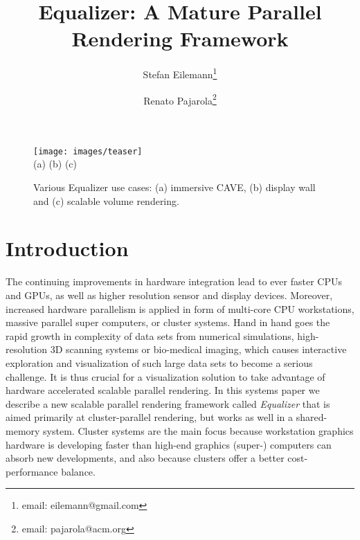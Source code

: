 \documentclass[journal]{vgtc}                %
\title{Equalizer: A Mature Parallel Rendering Framework}
\author{Stefan Eilemann\thanks{email: eilemann@gmail.com} \\ %
\and Renato Pajarola\thanks{email: pajarola@acm.org}}
\affiliation{\scriptsize Visualization and MultiMedia Lab \\ Department of Informatics \\ University of Z\"urich}
\begin{document}

\maketitle

\begin{figure*}[ht]\center
  \texttt{[image: images/teaser]} \\
  (a) \hfil \hfil (b) \hfil \hfil (c)
  \vspace{-2mm}
  \caption{Various Equalizer use cases: (a) immersive CAVE, (b) display wall and
    (c) scalable volume rendering.}
  \label{FIG_teaser}
\end{figure*}

\section{Introduction}

The continuing improvements in hardware integration lead to ever faster CPUs and GPUs, as well as higher resolution sensor and display devices. Moreover, increased hardware parallelism is applied in form of multi-core CPU workstations, massive parallel super computers, or cluster systems. Hand in hand goes the rapid growth in complexity of data sets from numerical simulations, high-resolution 3D scanning systems or bio-medical imaging, which causes interactive exploration and visualization of such large data sets to become a serious challenge. It is thus crucial for a visualization solution to take advantage of hardware accelerated scalable parallel rendering. In this systems paper we describe a new scalable parallel rendering framework called {\em Equalizer} that is aimed primarily at cluster-parallel rendering, but works as well in a shared-memory system. Cluster systems are the main focus  because workstation graphics hardware is developing faster than high-end graphics (super-) computers can absorb new developments, and also because clusters offer a better cost-performance balance.
\end{document}
